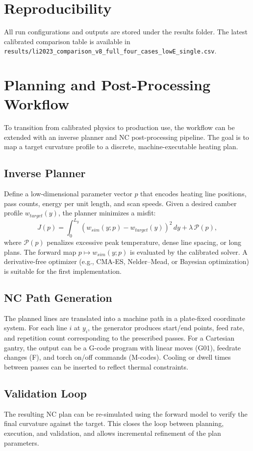\documentclass[11pt]{article}
\begin{document}
\section{Reproducibility}
All run configurations and outputs are stored under the results folder. The latest
calibrated comparison table is available in
\texttt{results/li2023\_comparison\_v8\_full\_four\_cases\_lowE\_single.csv}.

\section{Planning and Post-Processing Workflow}
To transition from calibrated physics to production use, the workflow can be extended with
an inverse planner and NC post-processing pipeline. The goal is to map a target curvature
profile to a discrete, machine-executable heating plan.

\subsection{Inverse Planner}
Define a low-dimensional parameter vector $p$ that encodes heating line positions, pass counts,
energy per unit length, and scan speeds. Given a desired camber profile $w_{target}(y)$, the
planner minimizes a misfit:
\begin{equation}
J(p) = \int_0^{L_y} \left(w_{sim}(y; p) - w_{target}(y)\right)^2\,dy + \lambda\,\mathcal{P}(p),
\end{equation}
where $\mathcal{P}(p)$ penalizes excessive peak temperature, dense line spacing, or long plans.
The forward map $p \mapsto w_{sim}(y; p)$ is evaluated by the calibrated solver. A derivative-free
optimizer (e.g., CMA-ES, Nelder--Mead, or Bayesian optimization) is suitable for the first
implementation.

\subsection{NC Path Generation}
The planned lines are translated into a machine path in a plate-fixed coordinate system. For each
line $i$ at $y_i$, the generator produces start/end points, feed rate, and repetition count
corresponding to the prescribed passes. For a Cartesian gantry, the output can be a G-code program
with linear moves (G01), feedrate changes (F), and torch on/off commands (M-codes). Cooling or
dwell times between passes can be inserted to reflect thermal constraints.

\subsection{Validation Loop}
The resulting NC plan can be re-simulated using the forward model to verify the final curvature
against the target. This closes the loop between planning, execution, and validation, and allows
incremental refinement of the plan parameters.
\end{document}
